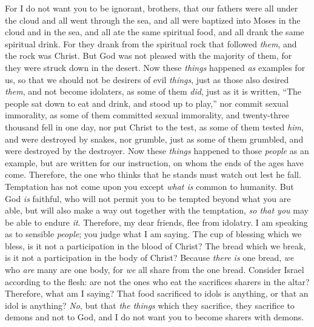 \begin{biblechapter} %
 For I do not want you to be ignorant, brothers, that our fathers were all under the cloud and all went through the sea,
\verse and all were baptized into Moses in the cloud and in the sea,
\verse and all ate the same spiritual food,
\verse and all drank the same spiritual drink. For they drank from the spiritual rock that followed \textit{them}, and the rock was Christ.
\verse But God was not pleased with the majority of them, for they were struck down in the desert.
\verse Now these \textit{things} happened \textit{as} examples for us, so that we should not be desirers of evil \textit{things}, just as those also desired \textit{them},
\verse and not become idolaters, as some of them \textit{did}, just as it is written, “The people sat down to eat and drink, and stood up to play,”
\verse nor commit sexual immorality, as some of them committed sexual immorality, and twenty-three thousand fell in one day,
\verse nor put Christ to the test, as some of them tested \textit{him}, and were destroyed by snakes,
\verse nor grumble, just as some of them grumbled, and were destroyed by the destroyer.
\verse Now these \textit{things} happened to those \textit{people} as an example, but are written for our instruction, on whom the ends of the ages have come.
\verse Therefore, the one who thinks that he stands must watch out lest he fall.
\verse Temptation has not come upon you except \textit{what is} common to humanity. But God \textit{is} faithful, who will not permit you to be tempted beyond what you are able, but will also make a way out together with the temptation, \textit{so that you} may be able to endure \textit{it}.
 Therefore, my dear friends, flee from idolatry.
\verse I am speaking as to sensible \textit{people}; you judge what I am saying.
\verse The cup of blessing which we bless, is it not a participation in the blood of Christ? The bread which we break, is it not a participation in the body of Christ?
\verse Because \textit{there is} one bread, \textit{we} who \textit{are} many are one body, for \textit{we} all share from the one bread.
\verse Consider Israel according to the flesh: are not the ones who eat the sacrifices sharers in the altar?
\verse Therefore, what am I saying? That food sacrificed to idols is anything, or that an idol is anything?
\verse \textit{No}, but that \textit{the things} which they sacrifice, they sacrifice to demons and not to God, and I do not want you to become sharers with demons.

\end{biblechapter}
